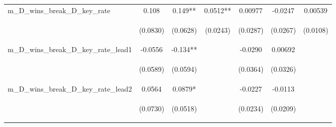 \begin{tabular}{lcccccc}
m\_D\_wins\_break\_D\_key\_rate & 0.108 & 0.149** & 0.0512** & 0.00977 & -0.0247 & 0.00539 \\
\vspace{4pt} & \begin{footnotesize}(0.0830)\end{footnotesize} & \begin{footnotesize}(0.0628)\end{footnotesize} & \begin{footnotesize}(0.0243)\end{footnotesize} & \begin{footnotesize}(0.0287)\end{footnotesize} & \begin{footnotesize}(0.0267)\end{footnotesize} & \begin{footnotesize}(0.0108)\end{footnotesize} \\
m\_D\_wins\_break\_D\_key\_rate\_lead1 & -0.0556 & -0.134** &  & -0.0290 & 0.00692 &  \\
\vspace{4pt} & \begin{footnotesize}(0.0589)\end{footnotesize} & \begin{footnotesize}(0.0594)\end{footnotesize} & \begin{footnotesize}\end{footnotesize} & \begin{footnotesize}(0.0364)\end{footnotesize} & \begin{footnotesize}(0.0326)\end{footnotesize} & \begin{footnotesize}\end{footnotesize} \\
m\_D\_wins\_break\_D\_key\_rate\_lead2 & 0.0564 & 0.0879* &  & -0.0227 & -0.0113 &  \\
\vspace{4pt} & \begin{footnotesize}(0.0730)\end{footnotesize} & \begin{footnotesize}(0.0518)\end{footnotesize} & \begin{footnotesize}\end{footnotesize} & \begin{footnotesize}(0.0234)\end{footnotesize} & \begin{footnotesize}(0.0209)\end{footnotesize} & \begin{footnotesize}\end{footnotesize} \\

\end{tabular}
